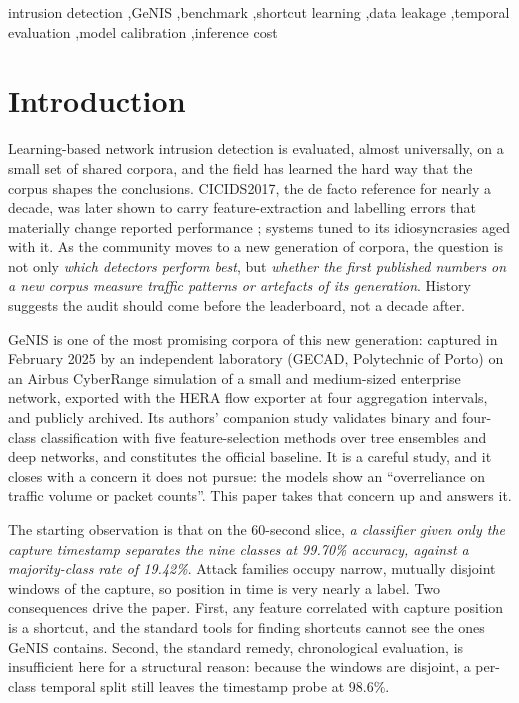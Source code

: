 \documentclass[review,12pt]{elsarticle}
\begin{document}
\begin{frontmatter}
\begin{keyword}
intrusion detection \sep GeNIS \sep benchmark \sep shortcut learning \sep data leakage
\sep temporal evaluation \sep model calibration \sep inference cost
\end{keyword}

\end{frontmatter}

\section{Introduction}
\label{sec:intro}

Learning-based network intrusion detection is evaluated, almost universally, on a small
set of shared corpora, and the field has learned the hard way that the corpus shapes the
conclusions. CICIDS2017, the de facto reference for nearly a decade, was later shown to
carry feature-extraction and labelling errors that materially change reported performance
\cite{engelen2021troubleshooting,liu2022error,lanvin2022errors}; systems tuned to its
idiosyncrasies aged with it. As the community moves to a new generation of corpora, the
question is not only \emph{which detectors perform best}, but \emph{whether the first
published numbers on a new corpus measure traffic patterns or artefacts of its
generation}. History suggests the audit should come before the leaderboard, not a decade
after.

GeNIS \cite{silva2025genis} is one of the most promising corpora of this new generation:
captured in February 2025 by an independent laboratory (GECAD, Polytechnic of Porto) on
an Airbus CyberRange simulation of a small and medium-sized enterprise network, exported
with the HERA flow exporter \cite{pinto2024hera} at four aggregation intervals, and
publicly archived. Its authors' companion study \cite{silva2025binary} validates binary
and four-class classification with five feature-selection methods over tree ensembles and
deep networks, and constitutes the official baseline. It is a careful study, and it
closes with a concern it does not pursue: the models show an ``overreliance on traffic
volume or packet counts''. This paper takes that concern up and answers it.

The starting observation is that on the 60-second slice, \emph{a classifier given only
the capture timestamp separates the nine classes at 99.70\% accuracy, against a
majority-class rate of 19.42\%}. Attack families occupy narrow, mutually disjoint windows
of the capture, so position in time is very nearly a label. Two consequences drive the
paper. First, any feature correlated with capture position is a shortcut, and the
standard tools for finding shortcuts cannot see the ones GeNIS contains. Second, the
standard remedy, chronological evaluation, is insufficient here for a structural
reason: because the windows are disjoint, a per-class temporal split still leaves the
timestamp probe at 98.6\%.
\end{document}
